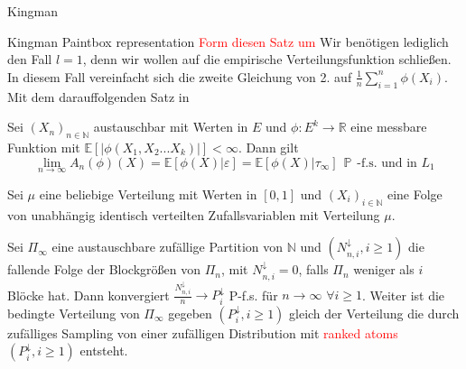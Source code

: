 \begin{section}{Kingman}
\begin{section}{Kingman Paintbox representation}
\textcolor{red}{Form diesen Satz um} Wir benötigen lediglich den Fall $l = 1$, denn wir wollen auf die empirische Verteilungsfunktion schließen. In diesem Fall vereinfacht sich die zweite Gleichung von 2. auf $\frac{1}{n}\sum_{i=1}^{n}\phi(X_i)$. Mit dem darauffolgenden Satz in \cite{NeiningerHS}
\begin{theorem}
\cite[Satz 8.12]{NeiningerHS}
Sei $(X_n)_{n \in \mathbb{N}}$ austauschbar mit Werten in $E$ und $\phi: E^k \to \mathbb{R}$ eine messbare Funktion mit $\mathbb{E}[|\phi(X_1,X_2 ... X_k)|] < \infty$. Dann gilt
\[
\lim_{n \to \infty}A_n(\phi)(X) = \mathbb{E}[\phi(X)|\varepsilon] = \mathbb{E}[\phi(X)|\tau_\infty]\hspace{5pt} \mathbb{P} \hspace{5pt} \text{-f.s. und in } L_1
\] 
\end{theorem}
Sei $\mu$ eine beliebige Verteilung mit Werten in $[0,1]$ und $(X_i)_{i \in \mathbb{N}}$ eine Folge von unabhängig identisch verteilten Zufallsvariablen mit Verteilung $\mu$.
\begin{theorem}
    Sei $\Pi_\infty$ eine austauschbare zufällige Partition von $\mathbb{N}$ und $(N^{\downarrow}_{n,i}, i \geq 1)$ die fallende Folge der Blockgrößen von $\Pi_n$, mit $N_{n,i}^\downarrow = 0$, falls $\Pi_n$ weniger als $i$ Blöcke hat. Dann konvergiert $\frac{N_{n,i}^\downarrow}{n} \rightarrow P^\downarrow_i$ P-f.s. für $n \to \infty$ $ \forall i \geq 1$. Weiter ist die bedingte Verteilung von $\Pi_\infty$ gegeben $(P_i^\downarrow, i \geq 1)$ gleich der Verteilung die durch zufälliges Sampling von einer zufälligen Distribution mit \textcolor{red}{ranked atoms} $(P^\downarrow_i, i \geq 1)$ entsteht.
\end{theorem}
\end{section}
\end{section}